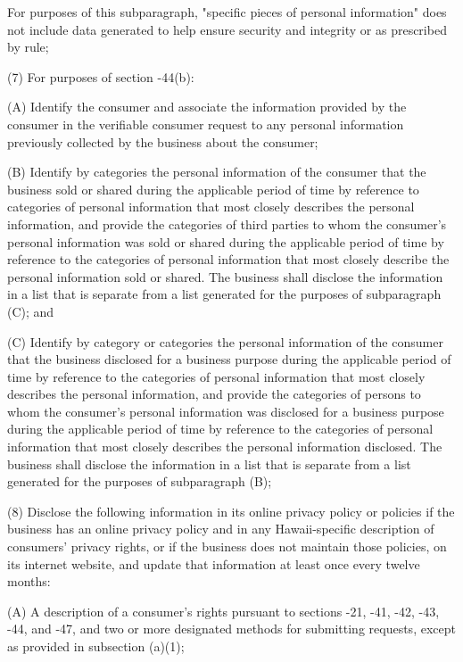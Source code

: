                     For purposes of this subparagraph, "specific pieces of personal information" does not include data generated to help ensure security and integrity or as prescribed by rule;

     (7)  For purposes of section    -44(b):

          (A)  Identify the consumer and associate the information provided by the consumer in the verifiable consumer request to any personal information previously collected by the business about the consumer;

          (B)  Identify by categories the personal information of the consumer that the business sold or shared during the applicable period of time by reference to categories of personal information that most closely describes the personal information, and provide the categories of third parties to whom the consumer's personal information was sold or shared during the applicable period of time by reference to the categories of personal information that most closely describe the personal information sold or shared.  The business shall disclose the information in a list that is separate from a list generated for the purposes of subparagraph (C); and

          (C)  Identify by category or categories the personal information of the consumer that the business disclosed for a business purpose during the applicable period of time by reference to the categories of personal information that most closely describes the personal information, and provide the categories of persons to whom the consumer's personal information was disclosed for a business purpose during the applicable period of time by reference to the categories of personal information that most closely describes the personal information disclosed.  The business shall disclose the information in a list that is separate from a list generated for the purposes of subparagraph (B);

     (8)  Disclose the following information in its online privacy policy or policies if the business has an online privacy policy and in any Hawaii-specific description of consumers' privacy rights, or if the business does not maintain those policies, on its internet website, and update that information at least once every twelve months:

          (A)  A description of a consumer's rights pursuant to sections    -21,    -41,    -42,    -43,    -44, and    -47, and two or more designated methods for submitting requests, except as provided in subsection (a)(1);

